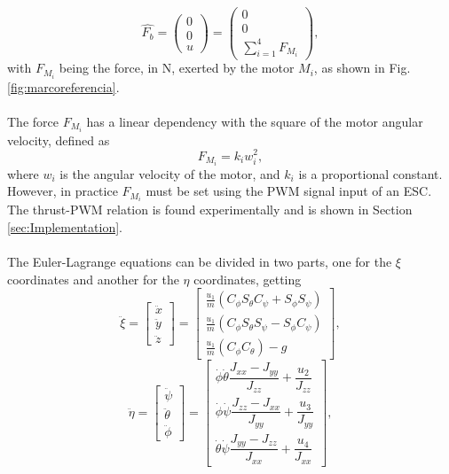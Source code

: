 \begin{equation}
	\hat{F_{b}}=\begin{pmatrix}
	0\\
	0\\
	u
	\end{pmatrix} = \begin{pmatrix}
	0\\
	0\\
	\sum_{i=1}^{4}F_{M_i}
	\end{pmatrix}  ,
 \label{ec:fuerzas}
 \end{equation} 
with $ F_{M_i} $ being the force, in N, exerted by the motor $ M_{i}$, as shown in Fig. \ref{fig:marcoreferencia}.
\\\\
The force $ F_{M_i} $ has a linear dependency with the square of the motor angular velocity, defined as
\begin{equation}
	F_{M_i}=k_{i}w_{i}^{2},
	\label{ec:fi}
\end{equation}
where $ w_{i} $ is the angular velocity of the motor, and $ k_{i} $ is a proportional constant. However, in practice $F_{M_i}$ must be set using the PWM signal input of an ESC. The thrust-PWM relation is found experimentally and is shown in Section \ref{sec:Implementation}.
\\\\
The Euler-Lagrange equations can be divided in two parts, one for the $\xi$ coordinates and another for the $\eta$ coordinates, getting
\begin{equation}
\label{eqn:E-L1}
\ddot{\xi} =
\begin{bmatrix}
\ddot{x} \\ \ddot{y} \\ \ddot{z}
\end{bmatrix} 
=
\begin{bmatrix}
\frac{u_{1}}{m}(C_\phi S_\theta C_\psi + S_\phi S_\psi) \\
 \frac{u_{1}}{m}(C_\phi S_\theta S_\psi - S_\phi C_\psi) \\
\frac{u_{1}}{m}(C_\phi C_\theta) - g
\end{bmatrix},
\end{equation}
\begin{equation}
\label{eqn:E-L2}
\ddot{\eta} =
\begin{bmatrix}
\ddot{\psi} \\ \ddot{\theta} \\ \ddot{\phi}
\end{bmatrix} 
 =
\begin{bmatrix}
\dot{\phi}\dot{\theta}\dfrac{J_{xx}-J_{yy}}{J_{zz}} + \dfrac{u_{2}}{J_{zz}} \\
\dot{\phi}\dot{\psi}\dfrac{J_{zz}-J_{xx}}{J_{yy}} + \dfrac{u_{3}}{J_{yy}} \\
 \dot{\theta}\dot{\psi}\dfrac{J_{yy}-J_{zz}}{J_{xx}} +  \dfrac{u_{4}}{J_{xx}}
\end{bmatrix},
\end{equation}
